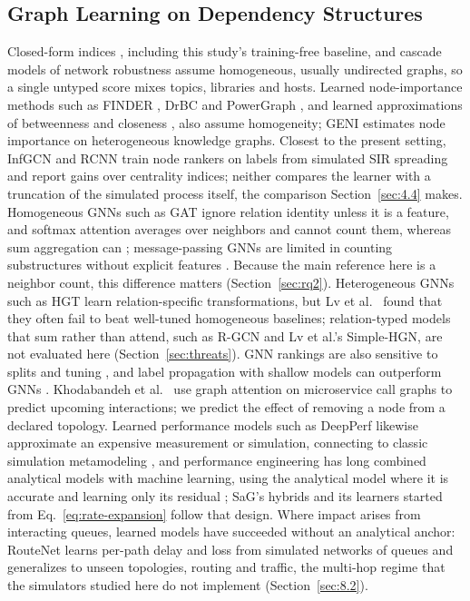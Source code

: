 \subsection{Graph Learning on Dependency Structures}
\label{sec:2.4}

Closed-form indices \cite{freeman1977centrality,brandes2001faster,brin1998pagerank,newman2010networks}, including this study's training-free baseline, and cascade models of network robustness \cite{albert2000error,motter2002cascade,buldyrev2010cascade} assume homogeneous, usually undirected graphs, so a single untyped score mixes topics, libraries and hosts. Learned node-importance methods such as FINDER \cite{fan2020keyplayers}, DrBC \cite{fan2019learning} and PowerGraph \cite{varbella2024powergraph}, and learned approximations of betweenness and closeness \cite{maurya2021gnnbet}, also assume homogeneity; GENI \cite{park2019geni} estimates node importance on heterogeneous knowledge graphs. Closest to the present setting, InfGCN \cite{zhao2020infgcn} and RCNN \cite{yu2020rcnn} train node rankers on labels from simulated SIR spreading and report gains over centrality indices; neither compares the learner with a truncation of the simulated process itself, the comparison Section~\ref{sec:4.4} makes. Homogeneous GNNs such as GAT \cite{velickovic2018graph} ignore relation identity unless it is a feature, and softmax attention averages over neighbors and cannot count them, whereas sum aggregation can \cite{xu2019gin,corso2020pna}; message-passing GNNs are limited in counting substructures without explicit features \cite{chen2020can}. Because the main reference here is a neighbor count, this difference matters (Section~\ref{sec:rq2}). Heterogeneous GNNs such as HGT \cite{hu2020hgt} learn relation-specific transformations, but Lv et al.~\cite{lv2021revisiting} found that they often fail to beat well-tuned homogeneous baselines; relation-typed models that sum rather than attend, such as R-GCN \cite{schlichtkrull2018rgcn} and Lv et al.'s Simple-HGN, are not evaluated here (Section~\ref{sec:threats}). GNN rankings are also sensitive to splits and tuning \cite{shchur2018pitfalls}, and label propagation with shallow models can outperform GNNs \cite{huang2021combining}. Khodabandeh et al.~\cite{khodabandeh2025linkpred} use graph attention on microservice call graphs to predict upcoming interactions; we predict the effect of removing a node from a declared topology. Learned performance models such as DeepPerf \cite{ha2019deepperf} likewise approximate an expensive measurement or simulation, connecting to classic simulation metamodeling \cite{kleijnen2015design}, and performance engineering has long combined analytical models with machine learning, using the analytical model where it is accurate and learning only its residual \cite{didona2015enhancing}; SaG's hybrids and its learners started from Eq.~\eqref{eq:rate-expansion} follow that design. Where impact arises from interacting queues, learned models have succeeded without an analytical anchor: RouteNet \cite{rusek2020routenet} learns per-path delay and loss from simulated networks of queues and generalizes to unseen topologies, routing and traffic, the multi-hop regime that the simulators studied here do not implement (Section~\ref{sec:8.2}).

